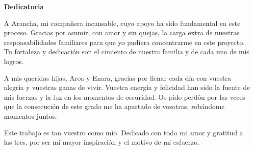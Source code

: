 \newpage
\textbf{Dedicatoria}

A Arancha, mi compañera incansable, cuyo apoyo ha sido fundamental en este proceso.
Gracias por asumir, con amor y sin quejas, la carga extra de nuestras responsabilidades familiares para que yo pudiera
concentrarme en este proyecto.
Tu fortaleza y dedicación son el cimiento de nuestra familia y de cada uno de mis logros.

A mis queridas hijas, Aroa y Enara, gracias por llenar cada día con vuestra alegría y vuestras ganas de vivir.
Vuestra energía y felicidad han sido la fuente de mis fuerzas y la luz en los momentos de oscuridad.
Os pido perdón por las veces que la consecución de este grado me ha apartado de vosotras, robándome momentos juntos.

Este trabajo es tan vuestro como mío.
Dedicado con todo mi amor y gratitud a las tres, por ser mi mayor inspiración y el motivo de mi esfuerzo.
